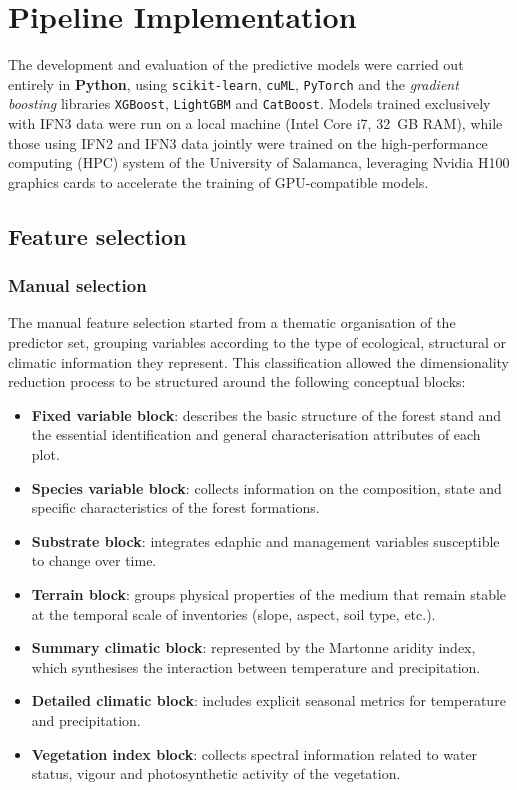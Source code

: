 \section{Pipeline Implementation}

The development and evaluation of the predictive models were carried out entirely in \textbf{Python}, using \texttt{scikit-learn}, \texttt{cuML}, \texttt{PyTorch} and the \textit{gradient boosting} libraries \texttt{XGBoost}, \texttt{LightGBM} and \texttt{CatBoost}. Models trained exclusively with IFN3 data were run on a local machine (Intel Core i7, 32~GB RAM), while those using IFN2 and IFN3 data jointly were trained on the high-performance computing (HPC) system of the University of Salamanca, leveraging Nvidia H100 graphics cards to accelerate the training of GPU-compatible models.

\subsection{Feature selection}\label{sec:seleccion_variables}

\subsubsection{Manual selection}

The manual feature selection started from a thematic organisation of the predictor set, grouping variables according to the type of ecological, structural or climatic information they represent. This classification allowed the dimensionality reduction process to be structured around the following conceptual blocks:

\begin{itemize}
    \item \textbf{Fixed variable block}: describes the basic structure of the forest stand and the essential identification and general characterisation attributes of each plot.
    \item \textbf{Species variable block}: collects information on the composition, state and specific characteristics of the forest formations.
    \item \textbf{Substrate block}: integrates edaphic and management variables susceptible to change over time.
    \item \textbf{Terrain block}: groups physical properties of the medium that remain stable at the temporal scale of inventories (slope, aspect, soil type, etc.).
    \item \textbf{Summary climatic block}: represented by the Martonne aridity index, which synthesises the interaction between temperature and precipitation.
    \item \textbf{Detailed climatic block}: includes explicit seasonal metrics for temperature and precipitation.
    \item \textbf{Vegetation index block}: collects spectral information related to water status, vigour and photosynthetic activity of the vegetation.
\end{itemize}

